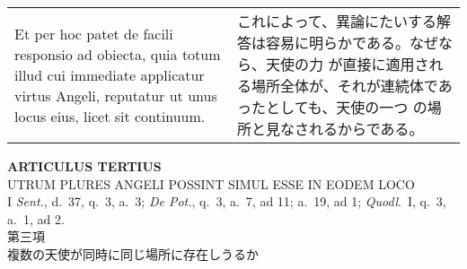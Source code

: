\documentclass[10pt]{jsarticle} %
\begin{document}
\begin{longtable}{p{21em}p{21em}}
\\


Et per hoc patet de facili responsio ad obiecta, quia totum illud cui
immediate applicatur virtus Angeli, reputatur ut unus locus eius, licet
sit continuum.

&

これによって、異論にたいする解答は容易に明らかである。なぜなら、天使の力
 が直接に適用される場所全体が、それが連続体であったとしても、天使の一つ
 の場所と見なされるからである。


\end{longtable}


\newpage

\begin{center}
 {\Large {\bf ARTICULUS TERTIUS}}\\
 {\large UTRUM PLURES ANGELI POSSINT SIMUL ESSE IN EODEM LOCO}\\
 {\footnotesize I {\itshape Sent.}, d.~37, q.~3, a.~3; {\itshape De
 Pot.}, q.~3, a.~7, ad 11; a.~19, ad 1; {\itshape Quodl}.~I, q.~3, a.~1,
 ad 2.}\\
 {\Large 第三項\\複数の天使が同時に同じ場所に存在しうるか}
\end{center}
\end{document}

